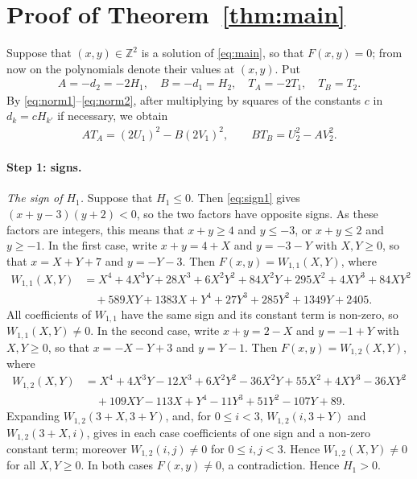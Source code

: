 \documentclass[11pt]{article}
\newcommand{\Z}{\mathbb{Z}}
\begin{document}
\section{Proof of Theorem~\ref{thm:main}}

Suppose that $(x,y)\in\Z^2$ is a solution of \eqref{eq:main}, so that $F(x,y)=0$; from now on the polynomials denote their values at $(x,y)$. Put
\begin{gather*}
A=-d_{2}=-2H_{1},\quad B=-d_{1}=H_{2},\quad T_A=-2T_{1},\quad T_B=T_{2}.
\end{gather*}
By \eqref{eq:norm1}--\eqref{eq:norm2}, after multiplying by squares of the constants $c$ in $d_k=cH_{k'}$ if necessary, we obtain
\begin{align}
AT_A=(2U_{1})^2-B(2V_{1})^2,\qquad BT_B=U_{2}^2-AV_{2}^2.\label{eq:AB}
\end{align}

\paragraph{Step 1: signs.} \emph{The sign of $H_{1}$.} Suppose that $H_{1}\leq0$. Then \eqref{eq:sign1} gives $(x+y-3)(y+2)<0$, so the two factors have opposite signs. As these factors are integers, this means that $x+y\geq4$ and $y\leq-3$, or $x+y\leq2$ and $y\geq-1$. In the first case, write $x+y=4+X$ and $y=-3-Y$ with $X,Y\geq0$, so that $x=X+Y+7$ and $y=-Y-3$. Then $F(x,y)=W_{1,1}(X,Y)$, where
\begin{align*}
W_{1,1}(X,Y)&=X^{4}+4X^{3}Y+28X^{3}+6X^{2}Y^{2}+84X^{2}Y+295X^{2}+4XY^{3}+84XY^{2}\\
&\quad+589XY+1383X+Y^{4}+27Y^{3}+285Y^{2}+1349Y+2405.
\end{align*}
All coefficients of $W_{1,1}$ have the same sign and its constant term is non-zero, so $W_{1,1}(X,Y)\neq0$. In the second case, write $x+y=2-X$ and $y=-1+Y$ with $X,Y\geq0$, so that $x=-X-Y+3$ and $y=Y-1$. Then $F(x,y)=W_{1,2}(X,Y)$, where
\begin{align*}
W_{1,2}(X,Y)&=X^{4}+4X^{3}Y-12X^{3}+6X^{2}Y^{2}-36X^{2}Y+55X^{2}+4XY^{3}-36XY^{2}\\
&\quad+109XY-113X+Y^{4}-11Y^{3}+51Y^{2}-107Y+89.
\end{align*}
Expanding $W_{1,2}(3+X,3+Y)$, and, for $0\leq i<3$, $W_{1,2}(i,3+Y)$ and $W_{1,2}(3+X,i)$, gives in each case coefficients of one sign and a non-zero constant term; moreover $W_{1,2}(i,j)\neq0$ for $0\leq i,j<3$. Hence $W_{1,2}(X,Y)\neq0$ for all $X,Y\geq0$. In both cases $F(x,y)\neq0$, a contradiction. Hence $H_{1}>0$.
\end{document}

